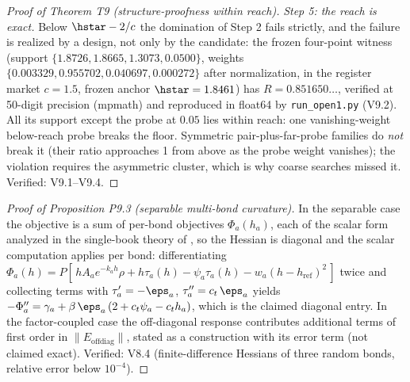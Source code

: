 \begin{proof}[Proof of Theorem T9 (structure-proofness within reach)]
\emph{Step 5: the reach is exact.} Below $\hstar - 2/c$ the
domination of Step 2 fails strictly, and the failure is realized by a
design, not only by the candidate: the frozen four-point witness
(support $\{1.8726, 1.8665, 1.3073, 0.0500\}$, weights
$\{0.003329, 0.955702, 0.040697, 0.000272\}$ after normalization, in
the register market $c = 1.5$, frozen anchor $\hstar = 1.8461$) has
$R = 0.851650\ldots$, verified at 50-digit precision (mpmath) and
reproduced in float64 by \texttt{run\_open1.py} (V9.2). All its
support except the probe at $0.05$ lies within reach: one
vanishing-weight below-reach probe breaks the floor. Symmetric
pair-plus-far-probe families do \emph{not} break it (their ratio
approaches 1 from above as the probe weight vanishes); the violation
requires the asymmetric cluster, which is why coarse searches missed
it. Verified: V9.1--V9.4.
\end{proof}

\begin{proof}[Proof of Proposition P9.3 (separable multi-bond curvature)]
In the separable case the objective is a sum of per-bond objectives
$\Phi_a(h_a)$, each of the scalar form analyzed in the single-book
theory of \citet{reflex2026}, so the Hessian is diagonal and the scalar computation applies
per bond: differentiating $\Phi_a(h) = P[\,h A_a e^{-k_a h}\rho + h
\tau_a(h) - \psi_a \tau_a(h) - w_a (h - h_{\mathrm{ref}})^2\,]$ twice and
collecting terms with $\tau_a' = -\eps_a$, $\tau_a'' = c_t\,\eps_a$ yields
$-\Phi_a'' = \gamma_a + \beta\,\eps_a\,(2 + c_t\psi_a - c_t h_a)$, which is
the claimed diagonal entry. In the factor-coupled case the off-diagonal
response contributes additional terms of first order in
$\|E_{\mathrm{offdiag}}\|$, stated as a construction with its error term
(not claimed exact). Verified: V8.4 (finite-difference Hessians of three
random bonds, relative error below $10^{-4}$).
\end{proof}

